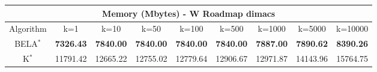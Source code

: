 \begin{tabular}{c|cccccccc}\toprule
\multicolumn{9}{c}{Memory (Mbytes) - W Roadmap dimacs}\\ \midrule
Algorithm & k=1 & k=10 & k=50 & k=100 & k=500 & k=1000 & k=5000 & k=10000 \\ \midrule
BELA$^*$ & \textbf{7326.43} & \textbf{7840.00} & \textbf{7840.00} & \textbf{7840.00} & \textbf{7840.00} & \textbf{7887.00} & \textbf{7890.62} & \textbf{8390.26} \\
K$^*$ & 11791.42 & 12665.22 & 12755.02 & 12779.64 & 12906.67 & 12971.87 & 14143.96 & 15764.75 \\ \bottomrule 
\end{tabular}
